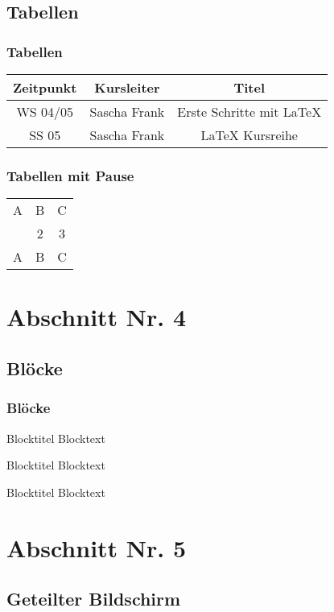 \documentclass[hyperref={pdfpagelabels=false}]{beamer}
\begin{document}
\subsection{Tabellen}
\begin{frame}
\frametitle{Tabellen}
\begin{tabular}{|c|c|c|}
\hline
\textbf{Zeitpunkt} & \textbf{Kursleiter} & \textbf{Titel} \\
\hline
WS 04/05 & Sascha Frank &  Erste Schritte mit \LaTeX{}  \\
\hline
SS 05 & Sascha Frank & \LaTeX{} Kursreihe \\
\hline
\end{tabular}
\end{frame}


\begin{frame}
\frametitle{Tabellen mit Pause}
\begin{tabular}{c c c}
A & B & C \\ 
\pause 
1 & 2 & 3 \\  
\pause 
A & B & C \\ 
\end{tabular} 
\end{frame}


\section{Abschnitt Nr. 4}
\subsection{Bl\"ocke}
\begin{frame}
\frametitle{Bl\"ocke}

\begin{block}{Blocktitel}
Blocktext 
\end{block}

\begin{exampleblock}{Blocktitel}
Blocktext 
\end{exampleblock}


\begin{alertblock}{Blocktitel}
Blocktext 
\end{alertblock}
\end{frame}

\section{Abschnitt Nr. 5}
\subsection{Geteilter Bildschirm}
\end{document}

